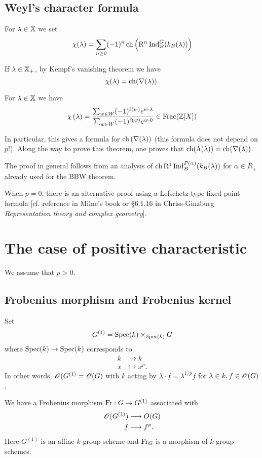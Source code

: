 \subsection{Weyl's character formula}
For $\lambda\in \mathbb{X}$ we set
\[
\chi(\lambda) = \sum_{n\ge 0}(-1)^{n}\operatorname{ch}\left( \mathrm{R}^{n}\operatorname{Ind}_B^{G}(k_B(\lambda)) \right) 
\] 
\begin{note}
	If $\lambda\in \mathbb{X}_+$, by Kempf's vanishing theorem we have
	\[
	\chi(\lambda) = \operatorname{ch}(\nabla(\lambda)).
	\] 
\end{note}
\begin{theorem}
	For $\lambda\in \mathbb{X}$ we have
	\[
		\chi\left( \lambda \right) = \frac{\sum_{w\in W}(-1)^{\ell(w)}e^{w\cdot \lambda}}{\sum_{w\in W}(-1)^{\ell(w)}e^{w\cdot 0}} \in \operatorname{Frac}(\mathbb Z[X])
	\] 
\end{theorem}
In particular, this gives a formula for $\operatorname{ch}\left( \nabla(\lambda) \right) $ (this formula does not depend on $p$!). Along the way to prove this theorem, one proves that $\operatorname{ch}(\Lambda(\lambda)) = \operatorname{ch}(\nabla(\lambda))$.

\begin{remark}
	The proof in general follows from an analysis of $\operatorname{ch}\mathrm{R}^{1}\operatorname{Ind}_B^{P(\alpha)}(k_B(\lambda))$ for $\alpha\in R_+$ already used for the BBW theorem.

	When $p=0$, there is an alternative proof using a Lefschetz-type fixed point formula [cf. reference in Milne's book or §6.1.16 in Chriss-Ginzburg \emph{Representation theory and complex geometry}].
\end{remark}

\section{The case of positive characteristic}
We assume that $p>0$.
\subsection{Frobenius morphism and Frobenius kernel}
Set
\[
G^{(1)} = \operatorname{Spec}(k)\times_{\operatorname{Spec}(k)} G
\] 
where $\Spec(k)\to \Spec(k)$ corresponds to
\begin{align*}
	k &\longrightarrow k \\
	x &\longmapsto x^{p}.
\end{align*}
In other words, $\mathscr{O}(G^{(1)}=\mathscr{O}(G)$ with $k$ acting by $\lambda\cdot f = \lambda^{1 /p}f$ for $\lambda\in k, f\in \mathscr{O}(G)$.

We have a Frobenius morphism $\Fr:G\to G^{(1)}$ associated with
\begin{align*}
	\mathscr{O}(G^{(1)}) &\longrightarrow O(G) \\
	f &\longmapsto f^{p}.
\end{align*}
Here $G^{(1)}$ is an affine $k$-group scheme and $\operatorname{Fr}_G$ is a morphism of $k$-group schemes.

